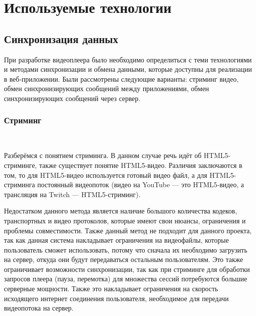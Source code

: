 \section{Используемые технологии}
\label{sec:practice:technology_used}
 
\subsection{Синхронизация данных}
При разработке видеоплеера было необходимо определиться с теми технологиями и методами синхронизации и обмена данными, которые доступны для реализации в веб-приложении. Были рассмотрены следующие варианты: стриминг видео, обмен синхронизирующих сообщений между приложениями, обмен синхронизирующих сообщений через сервер.
 
\subsubsection{Стриминг}~\par
Разберёмся с понятием стриминга. В данном случае речь идёт об HTML5-стриминге, также существует понятие HTML5-видео. Различия заключаются в том, то для HTML5-видео используется готовый видео файл, а для HTML5-стриминга постоянный видеопоток (видео на YouTube — это HTML5-видео, а трансляция на Twitch — HTML5-стриминг).
 
Недостатком данного метода является наличие большого количества кодеков, транспортных и видео протоколов, которые имеют свои нюансы, ограничения и проблемы совместимости. Также данный метод не подходит для данного проекта, так как данная система накладывает ограничения на видеофайлы, которые пользователь сможет использовать, потому что сначала их необходимо загрузить на сервер, откуда они будут передаваться остальным пользователям. Это также ограничивает возможности синхронизации, так как при стриминге для обработки запросов плеера (пауза, перемотка) для множества сессий потребуются большие серверные мощности. Также это накладывает ограничения на скорость исходящего интернет соединения пользователя, необходимое для передачи видеопотока на сервер.
 
